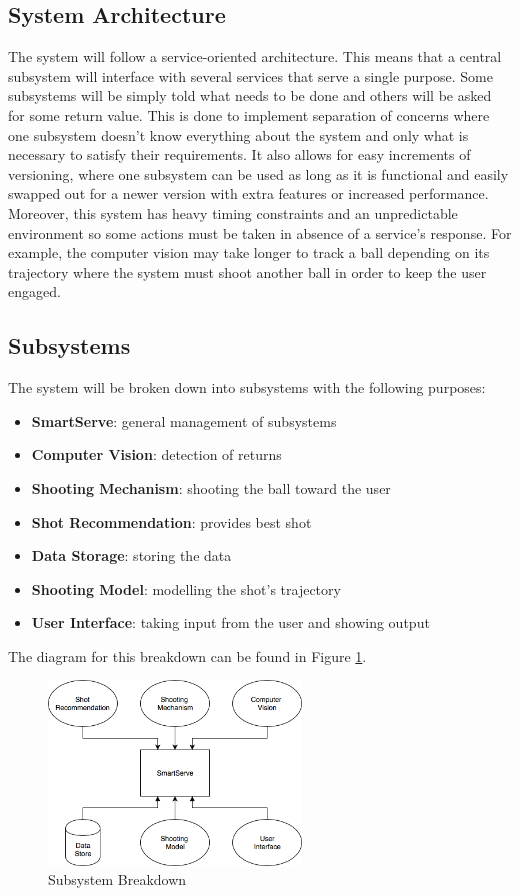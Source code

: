 \documentclass[11pt]{article}
\begin{document}
\subsection{System Architecture}
The system will follow a service-oriented architecture. This means that a central subsystem will interface with several services that serve a single purpose. Some subsystems will be simply told what needs to be done and others will be asked for some return value. This is done to implement separation of concerns where one subsystem doesn't know everything about the system and only what is necessary to satisfy their requirements. It also allows for easy increments of versioning, where one subsystem can be used as long as it is functional and easily swapped out for a newer version with extra features or increased performance. Moreover, this system has heavy timing constraints and an unpredictable environment so some actions must be taken in absence of a service's response. For example, the computer vision may take longer to track a ball depending on its trajectory where the system must shoot another ball in order to keep the user engaged.

\subsection{Subsystems}
The system will be broken down into subsystems with the following purposes: 
\begin{itemize}
\item \textbf{SmartServe}: general management of subsystems
\item \textbf{Computer Vision}:  detection of returns
\item \textbf{Shooting Mechanism}:  shooting the ball toward the user
\item \textbf{Shot Recommendation}: provides best shot
\item \textbf{Data Storage}: storing the data
\item \textbf{Shooting Model}: modelling the shot's trajectory
\item \textbf{User Interface}: taking input from the user and showing output
\end{itemize}
The diagram for this breakdown can be found in Figure \ref{fig:sub}.
\begin{figure}[H]
   \centering
   \includegraphics[width=0.6\textwidth]{img/Subsystem.png} %
   \caption{Subsystem Breakdown}
   \label{fig:sub}
\end{figure}
\end{document}
